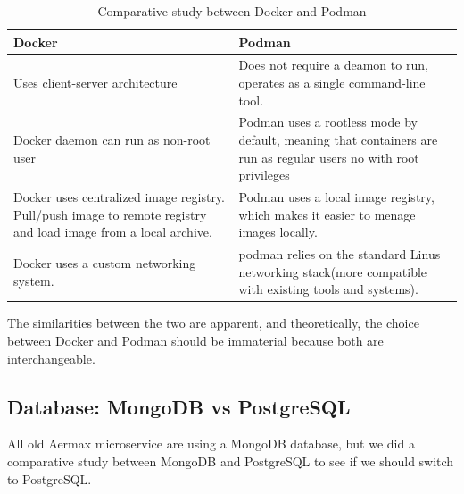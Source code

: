 \begin{table}[h!]
  \centering
  \renewcommand{\arraystretch}{1.5} 
  \caption{Comparative study between Docker and Podman}
  \label{tab: comparative_study_between_Docker_and_Podman}
  \begin{tabularx}{\textwidth}{|>{\centering\arraybackslash}X|>{\centering\arraybackslash}X|}
      \hline
      \rowcolor{blue!20} 
      \textbf{Docker} & \textbf{Podman} \\
      \hline
      Uses client-server architecture & Does not require a deamon to run, operates as a single command-line tool. \\
      \hline
      Docker daemon can run as non-root user & Podman uses a rootless mode by default, meaning that containers are run as regular users no with root privileges \\
      \hline
      Docker uses centralized image registry. Pull/push image to remote registry and load image from a local archive. & Podman uses a local image registry, which makes it easier to menage images locally.  \\
      \hline
      Docker uses a custom networking system. & podman relies on the standard Linus networking stack(more compatible with existing tools and systems).  \\
      \hline
  \end{tabularx}
\end{table}
The similarities between the two are apparent, and theoretically, the choice between Docker and Podman should be immaterial because both are interchangeable.


\subsection{Database: MongoDB vs PostgreSQL}
All old Aermax microservice are using a MongoDB database, but we did a comparative study between MongoDB and PostgreSQL to see if we should switch to PostgreSQL.


